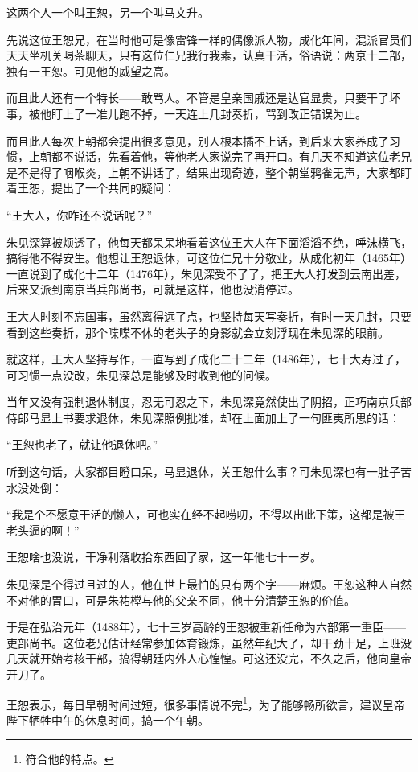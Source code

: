 \begin{multicols}{\theparacolNo}
这两个人一个叫王恕，另一个叫马文升。

先说这位王恕兄，在当时他可是像雷锋一样的偶像派人物，成化年间，混派官员们天天坐机关喝茶聊天，只有这位仁兄我行我素，认真干活，俗语说：两京十二部，独有一王恕。可见他的威望之高。

而且此人还有一个特长——敢骂人。不管是皇亲国戚还是达官显贵，只要干了坏事，被他盯上了一准儿跑不掉，一天连上几封奏折，骂到改正错误为止。

而且此人每次上朝都会提出很多意见，别人根本插不上话，到后来大家养成了习惯，上朝都不说话，先看着他，等他老人家说完了再开口。有几天不知道这位老兄是不是得了咽喉炎，上朝不讲话了，结果出现奇迹，整个朝堂鸦雀无声，大家都盯着王恕，提出了一个共同的疑问：

“王大人，你咋还不说话呢？”

朱见深算被烦透了，他每天都呆呆地看着这位王大人在下面滔滔不绝，唾沫横飞，搞得他不得安生。他想让王恕退休，可这位仁兄十分敬业，从成化初年（1465年）一直说到了成化十二年（1476年），朱见深受不了了，把王大人打发到云南出差，后来又派到南京当兵部尚书，可就是这样，他也没消停过。

王大人时刻不忘国事，虽然离得远了点，也坚持每天写奏折，有时一天几封，只要看到这些奏折，那个喋喋不休的老头子的身影就会立刻浮现在朱见深的眼前。

就这样，王大人坚持写作，一直写到了成化二十二年（1486年），七十大寿过了，可习惯一点没改，朱见深总是能够及时收到他的问候。

当年又没有强制退休制度，忍无可忍之下，朱见深竟然使出了阴招，正巧南京兵部侍郎马显上书要求退休，朱见深照例批准，却在上面加上了一句匪夷所思的话：

“王恕也老了，就让他退休吧。”

听到这句话，大家都目瞪口呆，马显退休，关王恕什么事？可朱见深也有一肚子苦水没处倒：

“我是个不愿意干活的懒人，可也实在经不起唠叨，不得以出此下策，这都是被王老头逼的啊！”

王恕啥也没说，干净利落收拾东西回了家，这一年他七十一岁。

朱见深是个得过且过的人，他在世上最怕的只有两个字——麻烦。王恕这种人自然不对他的胃口，可是朱祐樘与他的父亲不同，他十分清楚王恕的价值。

于是在弘治元年（1488年），七十三岁高龄的王恕被重新任命为六部第一重臣——吏部尚书。这位老兄估计经常参加体育锻炼，虽然年纪大了，却干劲十足，上班没几天就开始考核干部，搞得朝廷内外人心惶惶。可这还没完，不久之后，他向皇帝开刀了。

王恕表示，每日早朝时间过短，很多事情说不完\footnote{符合他的特点。}，为了能够畅所欲言，建议皇帝陛下牺牲中午的休息时间，搞一个午朝。


\end{multicols}
